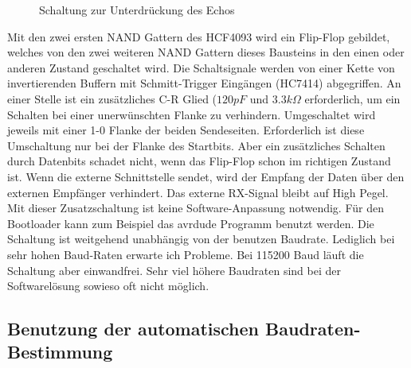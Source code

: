 \begin{figure}[H]
\centering
{}
\caption{Schaltung zur Unterdrückung des Echos}
\label{fig:onewire}
\end{figure}

Mit den zwei ersten NAND Gattern des HCF4093 wird ein Flip-Flop gebildet,
welches von den zwei weiteren NAND Gattern dieses Bausteins
in den einen oder anderen Zustand geschaltet wird. Die Schaltsignale werden von
einer Kette von invertierenden Buffern mit Schmitt-Trigger Eingängen (HC7414) abgegriffen.
An einer Stelle ist ein zusätzliches C-R Glied (\(120 pF\) und \(3.3 k\Omega\) erforderlich,
um ein Schalten bei einer unerwünschten Flanke zu verhindern.
Umgeschaltet wird jeweils mit einer 1-0 Flanke der beiden Sendeseiten.
Erforderlich ist diese Umschaltung nur bei der Flanke des Startbits.
Aber ein zusätzliches Schalten durch Datenbits schadet nicht, wenn das Flip-Flop schon im
richtigen Zustand ist. Wenn die externe Schnittstelle sendet, wird der Empfang der
Daten über den externen Empfänger verhindert. Das externe RX-Signal bleibt auf High Pegel.
Mit dieser Zusatzschaltung ist keine Software-Anpassung notwendig. Für den
Bootloader kann zum Beispiel das avrdude Programm benutzt werden.
Die Schaltung ist weitgehend unabhängig von der benutzen Baudrate.
Lediglich bei sehr hohen Baud-Raten erwarte ich Probleme. Bei 115200 Baud läuft die Schaltung
aber einwandfrei. Sehr viel höhere Baudraten sind bei der Softwarelösung sowieso
oft nicht möglich.

\subsection{Benutzung der automatischen Baudraten-Bestimmung}

